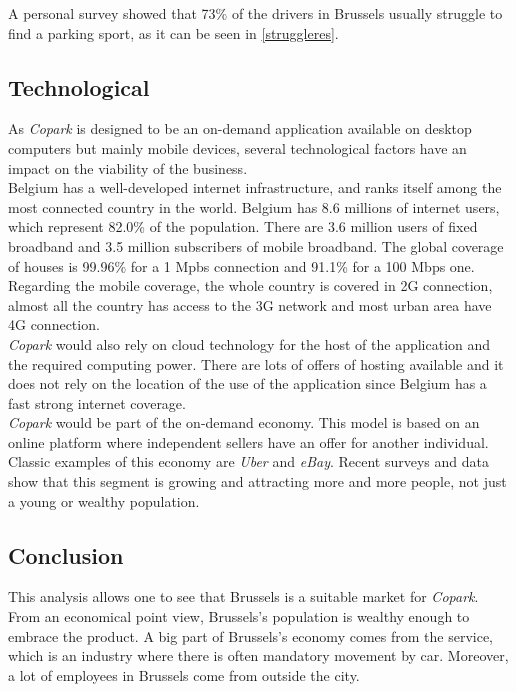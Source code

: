 \documentclass[12pt,a4paper,oneside]{book}
\newcommand{\bp}{\textit{Copark}}
\begin{document}
A personal survey showed that 73\% of the drivers in Brussels usually struggle to find a parking sport, as it can be seen in \autoref{struggleres}.

\subsection{Technological}
As \bp{} is designed to be an on-demand application available on desktop computers but mainly mobile devices, several technological factors have an impact on the viability of the business.\\

Belgium has a well-developed internet infrastructure, and ranks itself among the most connected country in the world. Belgium has 8.6 millions of internet users, which represent 82.0\% of the population.\cite{intuser} There are 3.6 million users of fixed broadband and 3.5 million subscribers of mobile broadband.\cite{intsub} The global coverage of houses is 99.96\% for a 1 Mpbs connection and 91.1\% for a 100 Mbps one.\cite{fixcov} Regarding the mobile coverage, the whole country is covered in 2G connection, almost all the country has access to the 3G network and most urban area have 4G connection.\cite{mobcov}\\

\bp{} would also rely on cloud technology for the host of the application and the required computing power. There are lots of offers of hosting available and it does not rely on the location of the use of the application since Belgium has a fast strong internet coverage.\\

\bp{} would be part of the on-demand economy. This model is based on an online platform where independent sellers have an offer for another individual. Classic examples of this economy are \textit{Uber} and \textit{eBay}. Recent surveys and data show that this segment is growing and attracting more and more people, not just a young or wealthy population.\cite{odegrow}

\subsection{Conclusion}
This analysis allows one to see that Brussels is a suitable market for \bp{}.\\

From an economical point view, Brussels's population is wealthy enough to embrace the product. A big part of Brussels's economy comes from the service, which is an industry where there is often mandatory movement by car. Moreover, a lot of employees in Brussels come from outside the city.\\
\end{document}
